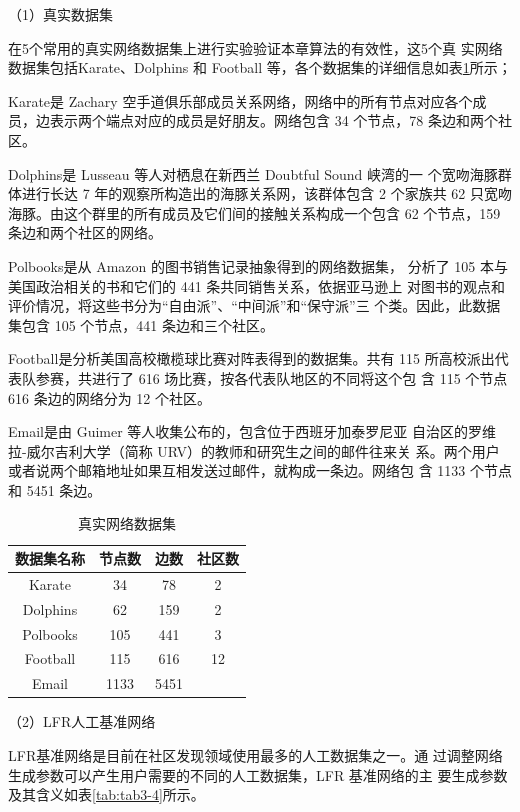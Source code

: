 （1）真实数据集

在5个常用的真实网络数据集上进行实验验证本章算法的有效性，这5个真
实网络数据集包括Karate、Dolphins 和 Football 等，各个数据集的详细信息如表\ref{tab:tab3-3}所示；

Karate是 Zachary 空手道俱乐部成员关系网络，网络中的所有节点对应各个成员，边表示两个端点对应的成员是好朋友。网络包含 34 个节点，78 条边和两个社区。 

Dolphins是 Lusseau 等人对栖息在新西兰 Doubtful Sound 峡湾的一
个宽吻海豚群体进行长达 7 年的观察所构造出的海豚关系网，该群体包含 2 个家族共 62 只宽吻海豚。由这个群里的所有成员及它们间的接触关系构成一个包含
62 个节点，159 条边和两个社区的网络。

Polbooks是从 Amazon 的图书销售记录抽象得到的网络数据集，
分析了 105 本与美国政治相关的书和它们的 441 条共同销售关系，依据亚马逊上
对图书的观点和评价情况，将这些书分为“自由派”、“中间派”和“保守派”三
个类。因此，此数据集包含 105 个节点，441 条边和三个社区。

Football是分析美国高校橄榄球比赛对阵表得到的数据集。共有 115
所高校派出代表队参赛，共进行了 616 场比赛，按各代表队地区的不同将这个包
含 115 个节点 616 条边的网络分为 12 个社区。 

Email是由 Guimer 等人收集公布的，包含位于西班牙加泰罗尼亚
自治区的罗维拉-威尔吉利大学（简称 URV）的教师和研究生之间的邮件往来关
系。两个用户或者说两个邮箱地址如果互相发送过邮件，就构成一条边。网络包
含 1133 个节点和 5451 条边。

\begin{table}
  \centering
  \caption{真实网络数据集} \label{tab:tab3-3}
  \begin{tabular*}{0.9\textwidth}{@{\extracolsep{\fill}}cccc}
  \toprule
    数据集名称		&节点数   &边数   &社区数\\
  \midrule
    Karate  &34 &78 &2\\
    Dolphins	&62 &159  &2\\
    Polbooks  &105  &441  &3\\
    Football  &115  &616  &12\\
    Email     &1133 &5451 \\
  \bottomrule
  \end{tabular*}
\end{table}

（2）LFR人工基准网络

LFR基准网络是目前在社区发现领域使用最多的人工数据集之一。通
过调整网络生成参数可以产生用户需要的不同的人工数据集，LFR 基准网络的主
要生成参数及其含义如表\ref{tab:tab3-4}所示。

